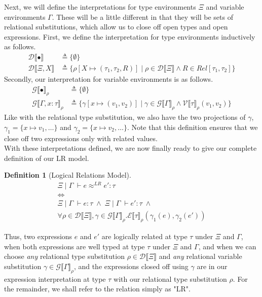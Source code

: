 \documentclass[a4paper, 11pt]{report}
\theoremstyle{definition}
\newtheorem{definition}{Definition}[section]
\newcommand{\var}{x}
\newcommand{\expr}{e}
\newcommand{\val}{v}
\newcommand{\Tvar}{X}
\newcommand{\typ}{\tau}
\newcommand{\venv}{\Gamma}
\newcommand{\tenv}{\Xi}
\newcommand{\emptenv}{\bullet}
\newcommand{\empvenv}{\bullet}
\newcommand{\jdg}[4]{#1 \; | \; #2 \; \vdash #3 : #4}
\newcommand{\jdgRel}[6]{#1 \; | \; #2 \; \vdash #3 \approx^{#4} #5 : #6}
\newcommand{\ValInp}[2]{\mathcal{V} \llbracket #1 \rrbracket_{#2}}
\newcommand{\ValInpGen}[2]{\ValInp{#1}{#2}(\val_1, \val_2)}
\newcommand{\ExpInp}[2]{\mathcal{E} \llbracket #1 \rrbracket_{#2}}
\newcommand{\VenvInp}[2]{\mathcal{G} \llbracket #1 \rrbracket_{#2}}
\newcommand{\TenvInp}[1]{\mathcal{D} \llbracket #1 \rrbracket}
\newcommand{\LogRel}[5]{\jdgRel{#1}{#2}{#3}{LR}{#4}{#5}}
\newcommand{\map}[2]{#1 \mapsto #2}
\begin{document}
Next, we will define the interpretations for type environments $\tenv$ and variable environments $\venv$. These will be a little different in that they will be sets of relational substitutions, which allow us to close off open types and open expressions. First, we define the interpretation for type environments inductively as follows.
\begin{align*}
  \TenvInp{\emptenv} &\triangleq \{ \emptyset \}\\
  \TenvInp{\tenv, \Tvar} &\triangleq \{\rho[\map{\Tvar}{(\typ_1, \typ_2, R)}] \mid \rho \in \TenvInp{\tenv} \land R \in Rel[\typ_1, \typ_2]\}
\end{align*}
Secondly, our interpretation for variable environments is as follows.
\begin{align*}
  \VenvInp{\empvenv}{\rho} &\triangleq \{ \emptyset \}\\
  \VenvInp{\venv, \var : \typ}{\rho} &\triangleq \{\gamma[\map{\var}{(\val_1, \val_2)}] \mid \gamma \in \VenvInp{\venv}{\rho} \land \ValInpGen{\typ}{\rho}\}
\end{align*}
Like with the relational type substitution, we also have the two projections of $\gamma$, $\gamma_1 = \{\var \mapsto \val_1, \dots\}$ and $\gamma_2 = \{\var \mapsto \val_2, \dots\}$. Note that this definition ensures that we close off two expressions only with related values.\\
With these interpretations defined, we are now finally ready to give our complete definition of our LR model.
\begin{definition}[Logical Relations Model]\label{def:LogRel}
  \begin{equation*}
    \begin{gathered}
      \LogRel{\tenv}{\venv}{\expr}{\expr'}{\typ}\\
      \iff\\
      \jdg{\tenv}{\venv}{\expr}{\typ} \; \land \; \jdg{\tenv}{\venv}{\expr'}{\typ} \; \land\\
      \forall \rho \in \TenvInp{\tenv}, \gamma \in \VenvInp{\venv}{\rho} . 
      \ExpInp{\typ}{\rho}(\gamma_1(\expr), \gamma_2(\expr'))
    \end{gathered}
  \end{equation*}
\end{definition}
Thus, two expressions $\expr$ and $\expr'$ are logically related at type $\typ$ under $\tenv$ and $\venv$, when both expressions are well typed at type $\typ$ under $\tenv$ and $\venv$, and when we can choose \textit{any} relational type substitution $\rho \in \TenvInp{\tenv}$ and \textit{any} relational variable substitution $\gamma \in \VenvInp{\venv}{\rho}$, and the expressions closed off using $\gamma$ are in our expression interpretation at type $\typ$ with our relational type substitution $\rho$. For the remainder, we shall refer to the relation simply as "LR".
\end{document}
